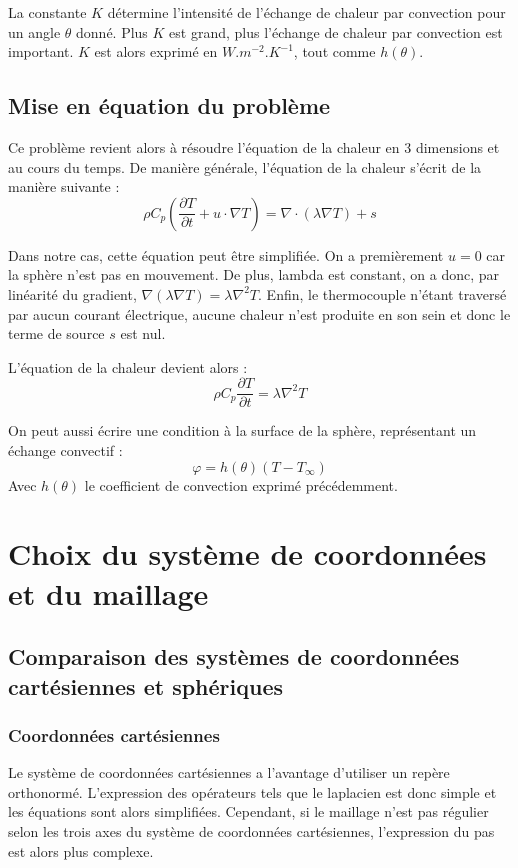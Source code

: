 \documentclass[fleqn]{article}
\renewcommand{\phi}{\varphi}
\begin{document}
La constante $K$ détermine l'intensité de l'échange de chaleur par convection pour un angle $\theta$ donné. Plus $K$ est grand, plus l'échange de chaleur par convection est important. $K$ est alors exprimé en $W.m^{-2}.K^{-1}$, tout comme $h(\theta)$.

\subsection{Mise en équation du problème}
Ce problème revient alors à résoudre l'équation de la chaleur en 3 dimensions et au cours du temps.
De manière générale, l'équation de la chaleur s'écrit de la manière suivante :
\begin{equation}
    \rho C_p \left(  \frac{ \partial T}{\partial t} + u \cdot \nabla T \right) = \nabla \cdot ( \lambda  \nabla T) + s
\end{equation}

Dans notre cas, cette équation peut être simplifiée. On a premièrement $u = 0$ car la sphère n'est pas en mouvement. De plus, lambda est constant, on a donc, par linéarité du gradient, $\nabla ( \lambda \nabla T ) = \lambda \nabla^2 T$. Enfin, le thermocouple n'étant traversé par aucun courant électrique, aucune chaleur n'est produite en son sein et donc le terme de source $s$ est nul.

L'équation de la chaleur devient alors :
\begin{equation}
    \rho C_p   \frac{ \partial T}{\partial t} = \lambda\nabla^2 T
    \label{equation_de_la_chaleur}
\end{equation}

On peut aussi écrire une condition à la surface de la sphère, représentant un échange convectif :
\[
\phi = h(\theta)(T-T_\infty)
\] 
Avec $h(\theta)$ le coefficient de convection exprimé précédemment.


\newpage
\section{Choix du système de coordonnées et du maillage}
\subsection{Comparaison des systèmes de coordonnées cartésiennes et sphériques}
\subsubsection{Coordonnées cartésiennes}
Le système de coordonnées cartésiennes a l'avantage d'utiliser un repère orthonormé. L'expression des opérateurs tels que le laplacien est donc simple et les équations sont alors simplifiées. Cependant, si le maillage n'est pas régulier selon les trois axes du système de coordonnées cartésiennes, l'expression du pas est alors plus complexe.
\end{document}
